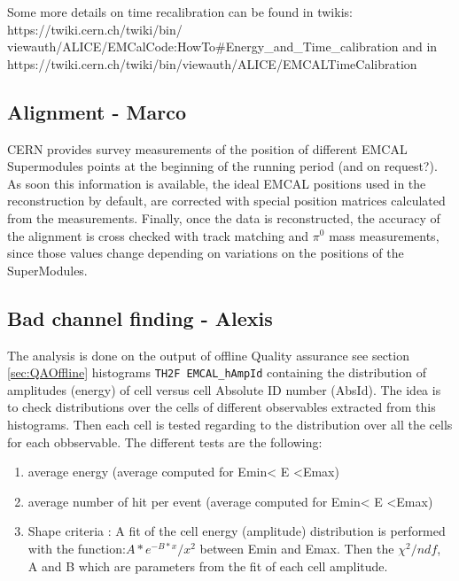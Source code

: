 Some more details on time recalibration can be found in twikis:
https://twiki.cern.ch/twiki/bin/\\viewauth/ALICE/EMCalCode:HowTo\#Energy\_and\_Time\_calibration and in \\
https://twiki.cern.ch/twiki/bin/viewauth/ALICE/EMCALTimeCalibration

\subsection{Alignment - Marco}

CERN provides survey measurements of the position of different EMCAL Supermodules points at the beginning of the running period (and on request?). As soon this information is available, the ideal EMCAL positions used in the reconstruction by default, are corrected with special position matrices calculated from the measurements. Finally, once the data is reconstructed, the accuracy of the alignment is cross checked with track matching and $\pi^{0}$ mass measurements, since those values change depending on variations on the positions of the SuperModules.

\subsection{Bad channel finding - Alexis}

The analysis is done on the output of offline Quality assurance see section \ref{sec:QAOffline} histograms \texttt{TH2F EMCAL\_hAmpId} containing the distribution of amplitudes (energy) of cell versus cell Absolute ID number (AbsId). The idea is to check distributions over the cells of different observables extracted from this histograms. Then each cell is tested regarding to the distribution over all the cells for each obbservable. The different tests are the following:

\begin{enumerate}
\item average energy (average computed for Emin< E  <Emax) 
\item average number of hit per event  (average computed for Emin< E  <Emax)
\item Shape criteria : A fit of the cell energy (amplitude) distribution is performed with the function:$A*e^{-B*x}/x^2$ between Emin and Emax.  Then the  $\chi^{2}/ndf$, A  and B which are parameters from the fit of each cell amplitude. 
\end{enumerate}

